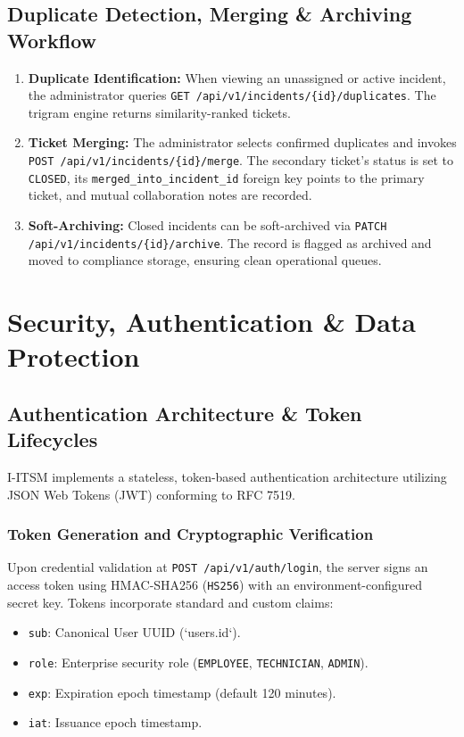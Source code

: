 \documentclass[11pt,a4paper,oneside]{report}
\begin{document}
\section{Duplicate Detection, Merging \& Archiving Workflow}
\label{sec:wf_duplicate_archiving}
\begin{enumerate}
    \item \textbf{Duplicate Identification:} When viewing an unassigned or active incident, the administrator queries \texttt{GET /api/v1/incidents/\{id\}/duplicates}. The trigram engine returns similarity-ranked tickets.
    \item \textbf{Ticket Merging:} The administrator selects confirmed duplicates and invokes \texttt{POST /api/v1/incidents/\{id\}/merge}. The secondary ticket's status is set to \texttt{CLOSED}, its \texttt{merged\_into\_incident\_id} foreign key points to the primary ticket, and mutual collaboration notes are recorded.
    \item \textbf{Soft-Archiving:} Closed incidents can be soft-archived via \texttt{PATCH /api/v1/incidents/\{id\}/archive}. The record is flagged as archived and moved to compliance storage, ensuring clean operational queues.
\end{enumerate}


\chapter{Security, Authentication \& Data Protection}
\label{ch:security}

\section{Authentication Architecture \& Token Lifecycles}
\label{sec:sec_auth}
I-ITSM implements a stateless, token-based authentication architecture utilizing JSON Web Tokens (JWT) conforming to RFC 7519. 

\subsection{Token Generation and Cryptographic Verification}
Upon credential validation at \texttt{POST /api/v1/auth/login}, the server signs an access token using HMAC-SHA256 (\texttt{HS256}) with an environment-configured secret key. Tokens incorporate standard and custom claims:
\begin{itemize}
    \item \texttt{sub}: Canonical User UUID (`users.id`).
    \item \texttt{role}: Enterprise security role (\texttt{EMPLOYEE}, \texttt{TECHNICIAN}, \texttt{ADMIN}).
    \item \texttt{exp}: Expiration epoch timestamp (default 120 minutes).
    \item \texttt{iat}: Issuance epoch timestamp.
\end{itemize}
\end{document}
